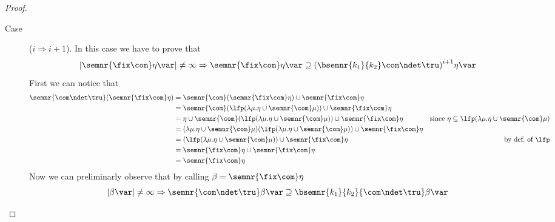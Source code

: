 \begin{proof}
\begin{inductive}
\begin{description}
    \item[Case] (\(i \Rightarrow i+1\)). In this case we have to prove
      that
      \begin{equation*}
        |\semnr{\fix\com}\eta\var| \neq \infty \Rightarrow \semnr{\fix\com}\eta\var \supseteq {\left(\bsemnr{k_1}{k_2}\com\ndet\tru\right)}^{i+1}\eta\var
      \end{equation*}
      First we can notice that
      \begin{align*}
        \semnr{\com\ndet\tru}(\semnr{\fix\com}\eta) & = \semnr{\com}(\semnr{\fix\com}\eta) \cup \semnr{\fix\com}\eta \\
                                                    & = \semnr{\com}(\lfp(\lambda \mu . \eta \cup \semnr{\com}\mu)) \cup \semnr{\fix\com}\eta \\
                                                    & = \eta \cup \semnr{\com}(\lfp(\lambda \mu . \eta \cup \semnr{\com}\mu)) \cup \semnr{\fix\com}\eta & \text{since } \eta \subseteq \lfp(\lambda \mu . \eta \cup \semnr{\com}\mu)\\
                                                    & = (\lambda \mu . \eta \cup \semnr{\com}\mu)(\lfp(\lambda \mu . \eta \cup \semnr{\com}\mu)) \cup \semnr{\fix\com}\eta \\
                                                    & = (\lfp(\lambda \mu . \eta \cup \semnr{\com}\mu)) \cup \semnr{\fix\com}\eta & \text{by def.\ of } \lfp\\
                                                    & = \semnr{\fix\com}\eta \cup \semnr{\fix\com}\eta \\
                                                    & = \semnr{\fix\com}\eta
      \end{align*}
      Now we can preliminarly observe that by calling
      \(\beta = \semnr{\fix\com}\eta\)
      \begin{equation}\label{eq:comfixbound}
        |\beta\var| \neq\infty \Rightarrow \semnr{\com\ndet\tru}\beta\var \supseteq \bsemnr{k_1}{k_2}{\com\ndet\tru}\beta\var

\end{equation}
\end{description}
\end{inductive}
\end{proof}
